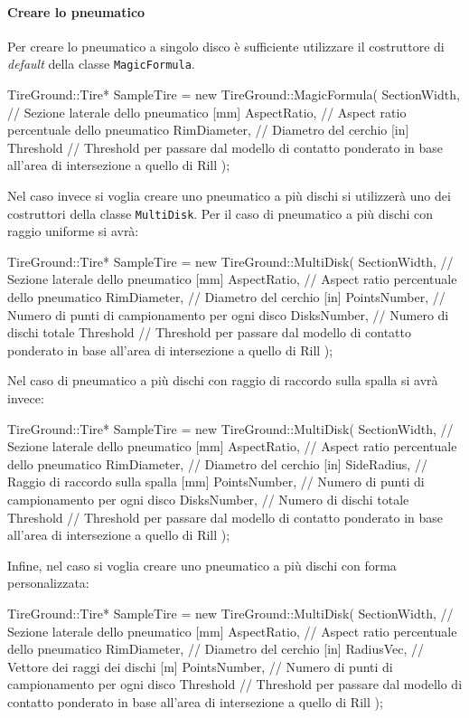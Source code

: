 \paragraph{Creare lo pneumatico}
Per creare lo pneumatico a singolo disco è sufficiente utilizzare il costruttore di \textit{default} della classe \texttt{MagicFormula}.
\begin{pseudoc}
	TireGround::Tire* SampleTire = new TireGround::MagicFormula(
		SectionWidth, // Sezione laterale dello pneumatico [mm]
		AspectRatio,  // Aspect ratio percentuale dello pneumatico
		RimDiameter,  // Diametro del cerchio [in]
		Threshold     // Threshold per passare dal modello di contatto ponderato in base all'area di intersezione a quello di Rill 
		);
\end{pseudoc}
Nel caso invece si voglia creare uno pneumatico a più dischi si utilizzerà uno dei costruttori della classe \texttt{MultiDisk}. Per il caso di pneumatico a più dischi con raggio uniforme si avrà:
\begin{pseudoc}
	TireGround::Tire* SampleTire = new TireGround::MultiDisk(
		SectionWidth, // Sezione laterale dello pneumatico [mm]
		AspectRatio,  // Aspect ratio percentuale dello pneumatico
		RimDiameter,  // Diametro del cerchio [in]
		PointsNumber, // Numero di punti di campionamento per ogni disco
		DisksNumber,  // Numero di dischi totale
		Threshold     // Threshold per passare dal modello di contatto ponderato in base all'area di intersezione a quello di Rill 
		);
\end{pseudoc}
Nel caso di pneumatico a più dischi con raggio di raccordo sulla spalla si avrà invece:
\begin{pseudoc}
	TireGround::Tire* SampleTire = new TireGround::MultiDisk(
		SectionWidth, // Sezione laterale dello pneumatico [mm]
		AspectRatio,  // Aspect ratio percentuale dello pneumatico
		RimDiameter,  // Diametro del cerchio [in]
		SideRadius,   // Raggio di raccordo sulla spalla [mm]
		PointsNumber, // Numero di punti di campionamento per ogni disco
		DisksNumber,  // Numero di dischi totale
		Threshold     // Threshold per passare dal modello di contatto ponderato in base all'area di intersezione a quello di Rill 
		);
\end{pseudoc}
Infine, nel caso si voglia creare uno pneumatico a più dischi con forma personalizzata:
\begin{pseudoc}
	TireGround::Tire* SampleTire = new TireGround::MultiDisk(
		SectionWidth, // Sezione laterale dello pneumatico [mm]
		AspectRatio,  // Aspect ratio percentuale dello pneumatico
		RimDiameter,  // Diametro del cerchio [in]
		RadiusVec,    // Vettore dei raggi dei dischi [m]
		PointsNumber, // Numero di punti di campionamento per ogni disco
		Threshold     // Threshold per passare dal modello di contatto ponderato in base all'area di intersezione a quello di Rill 
		);
\end{pseudoc}
%
